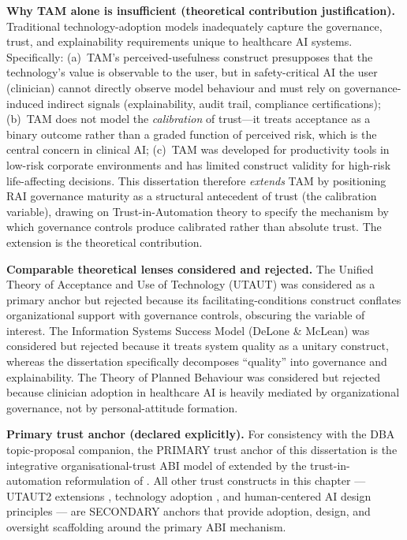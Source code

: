 \noindent\textbf{Why TAM alone is insufficient (theoretical contribution justification).} Traditional technology-adoption models inadequately capture the governance, trust, and explainability requirements unique to healthcare AI systems. Specifically: (a)~TAM's perceived-usefulness construct presupposes that the technology's value is observable to the user, but in safety-critical AI the user (clinician) cannot directly observe model behaviour and must rely on governance-induced indirect signals (explainability, audit trail, compliance certifications); (b)~TAM does not model the \emph{calibration} of trust---it treats acceptance as a binary outcome rather than a graded function of perceived risk, which is the central concern in clinical AI; (c)~TAM was developed for productivity tools in low-risk corporate environments and has limited construct validity for high-risk life-affecting decisions. This dissertation therefore \emph{extends} TAM by positioning RAI governance maturity as a structural antecedent of trust (the calibration variable), drawing on Trust-in-Automation theory to specify the mechanism by which governance controls produce calibrated rather than absolute trust. The extension is the theoretical contribution.

\noindent\textbf{Comparable theoretical lenses considered and rejected.} The Unified Theory of Acceptance and Use of Technology (UTAUT) was considered as a primary anchor but rejected because its facilitating-conditions construct conflates organizational support with governance controls, obscuring the variable of interest. The Information Systems Success Model (DeLone \& McLean) was considered but rejected because it treats system quality as a unitary construct, whereas the dissertation specifically decomposes ``quality'' into governance and explainability. The Theory of Planned Behaviour was considered but rejected because clinician adoption in healthcare AI is heavily mediated by organizational governance, not by personal-attitude formation.

\noindent\textbf{Primary trust anchor (declared explicitly).} For consistency with the DBA topic-proposal companion, the PRIMARY trust anchor of this dissertation is the integrative organisational-trust ABI model of \cite{mayer1995trust} extended by the trust-in-automation reformulation of \cite{lee2004trust}. All other trust constructs in this chapter --- UTAUT2 extensions \cite{venkatesh2012utaut2}, technology adoption \cite{davis1989tam}, and human-centered AI design principles \cite{shneiderman2020hcai} --- are SECONDARY anchors that provide adoption, design, and oversight scaffolding around the primary ABI mechanism.

